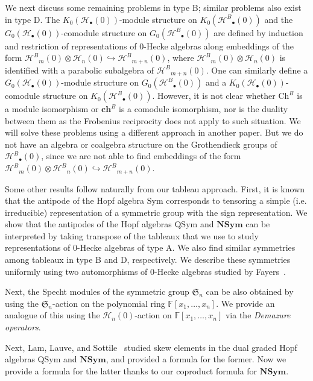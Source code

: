 \documentclass{amsart}
\newtheorem*{Young's Rule}{Young's Rule}
\theoremstyle{definition}
\theoremstyle{remark}
\numberwithin{equation}{section}
\begin{document}
We next discuss some remaining problems in type B; similar problems also exist in type D. The $K_0({\mathcal{H}}_\bullet(0))$-module structure on $K_0({\mathcal{H}^B}_\bullet(0))$ and the $G_0({\mathcal{H}}_\bullet(0))$-comodule structure on $G_0({\mathcal{H}^B}_\bullet(0))$ are defined by induction and restriction of representations of 0-Hecke algebras along embeddings of the form ${\mathcal{H}^B}_m(0)\otimes{\mathcal{H}}_n(0)\hookrightarrow{\mathcal{H}^B}_{m+n}(0)$, where ${\mathcal{H}^B}_m(0)\otimes{\mathcal{H}}_n(0)$ is identified with a parabolic subalgebra of ${\mathcal{H}^B}_{m+n}(0)$. One can similarly define a $G_0({\mathcal{H}}_\bullet(0))$-module structure on $G_0({\mathcal{H}^B}_\bullet(0))$ and a $K_0({\mathcal{H}}_\bullet(0))$-comodule structure on $K_0({\mathcal{H}^B}_\bullet(0))$. However, it is not clear whether $\mathrm{Ch}^B$ is a module isomorphism or $\mathbf{ch}^B$ is a comodule isomorphism, nor is the duality between them as the Frobenius reciprocity does not apply to such situation. We will solve these problems using a different approach in another paper. But we do not have an algebra or coalgebra structure on the Grothendieck groups of ${\mathcal{H}^B}_\bullet(0)$, since we are not able to find embeddings of the form ${\mathcal{H}^B}_m(0)\otimes{\mathcal{H}^B}_n(0)\hookrightarrow{\mathcal{H}^B}_{m+n}(0)$. 

Some other results follow naturally from our tableau approach. First, it is known that the antipode of the Hopf algebra ${\mathrm{Sym}}$ corresponds to tensoring a simple (i.e. irreducible) representation of a symmetric group with the sign representation. We show that the antipodes of the Hopf algebras ${\mathrm{QSym}}$ and ${\mathbf{NSym}}$ can be interpreted by taking transpose of the tableaux that we use to study representations of 0-Hecke algebras of type A. We also find similar symmetries among tableaux in type B and D, respectively. We describe these symmetries uniformly using two automorphisms of 0-Hecke algebras studied by Fayers~\cite{Fayers}.

Next, the Specht modules of the symmetric group ${{\mathfrak S}}_n$ can be also obtained by using the ${{\mathfrak S}}_n$-action on the polynomial ring ${{\mathbb F}}[x_1,\ldots,x_n]$. We provide an analogue of this using the ${\mathcal{H}}_n(0)$-action on ${{\mathbb F}}[x_1,\ldots,x_n]$ via the \emph{Demazure operators}.

Next, Lam, Lauve, and Sottile~\cite{Skew} studied skew elements in the dual graded Hopf algebras ${\mathrm{QSym}}$ and ${\mathbf{NSym}}$, and provided a formula for the former. Now we provide a formula for the latter thanks to our coproduct formula for ${\mathbf{NSym}}$.
\end{document}
